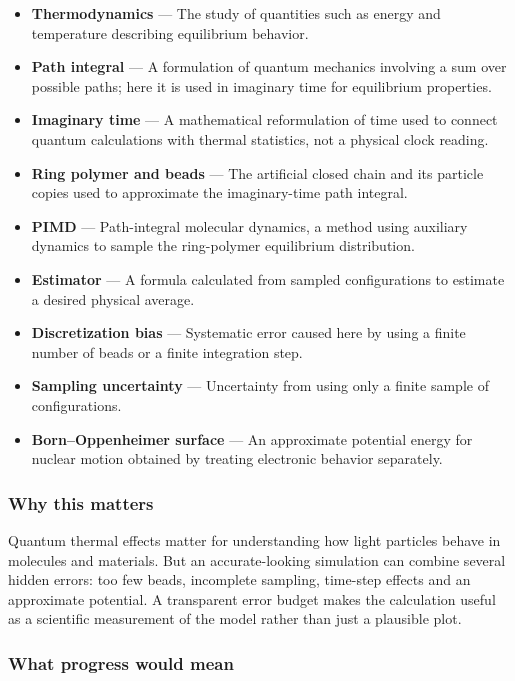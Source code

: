 \documentclass[
  11pt,
]{article}
\begin{document}
\begin{itemize}
\item
  \textbf{Thermodynamics} --- The study of quantities such as energy and
  temperature describing equilibrium behavior.
\item
  \textbf{Path integral} --- A formulation of quantum mechanics
  involving a sum over possible paths; here it is used in imaginary time
  for equilibrium properties.
\item
  \textbf{Imaginary time} --- A mathematical reformulation of time used
  to connect quantum calculations with thermal statistics, not a
  physical clock reading.
\item
  \textbf{Ring polymer and beads} --- The artificial closed chain and
  its particle copies used to approximate the imaginary-time path
  integral.
\item
  \textbf{PIMD} --- Path-integral molecular dynamics, a method using
  auxiliary dynamics to sample the ring-polymer equilibrium
  distribution.
\item
  \textbf{Estimator} --- A formula calculated from sampled
  configurations to estimate a desired physical average.
\item
  \textbf{Discretization bias} --- Systematic error caused here by using
  a finite number of beads or a finite integration step.
\item
  \textbf{Sampling uncertainty} --- Uncertainty from using only a finite
  sample of configurations.
\item
  \textbf{Born--Oppenheimer surface} --- An approximate potential energy
  for nuclear motion obtained by treating electronic behavior
  separately.
\end{itemize}

\subsubsection{Why this matters}

Quantum thermal effects matter for understanding how light particles
behave in molecules and materials. But an accurate-looking simulation
can combine several hidden errors: too few beads, incomplete sampling,
time-step effects and an approximate potential. A transparent error
budget makes the calculation useful as a scientific measurement of the
model rather than just a plausible plot.

\subsubsection{What progress would mean}
\end{document}
